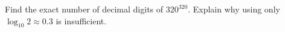 Find the exact number of decimal digits of $320^{320}$. Explain why using only $\log_{10}2\approx0.3$ is insufficient.
